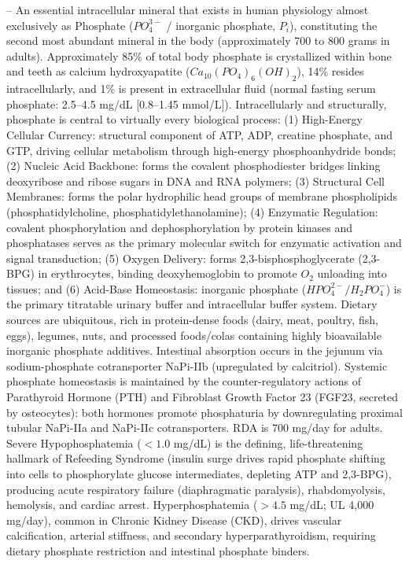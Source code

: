 -- An essential intracellular mineral that exists in human physiology almost exclusively as Phosphate ($PO_4^{3-}$ / inorganic phosphate, $P_i$), constituting the second most abundant mineral in the body (approximately 700 to 800 grams in adults). Approximately 85\% of total body phosphate is crystallized within bone and teeth as calcium hydroxyapatite ($Ca_{10}(PO_4)_6(OH)_2$), 14\% resides intracellularly, and 1\% is present in extracellular fluid (normal fasting serum phosphate: 2.5--4.5 mg/dL [0.8--1.45 mmol/L]). Intracellularly and structurally, phosphate is central to virtually every biological process: (1) High-Energy Cellular Currency: structural component of ATP, ADP, creatine phosphate, and GTP, driving cellular metabolism through high-energy phosphoanhydride bonds; (2) Nucleic Acid Backbone: forms the covalent phosphodiester bridges linking deoxyribose and ribose sugars in DNA and RNA polymers; (3) Structural Cell Membranes: forms the polar hydrophilic head groups of membrane phospholipids (phosphatidylcholine, phosphatidylethanolamine); (4) Enzymatic Regulation: covalent phosphorylation and dephosphorylation by protein kinases and phosphatases serves as the primary molecular switch for enzymatic activation and signal transduction; (5) Oxygen Delivery: forms 2,3-bisphosphoglycerate (2,3-BPG) in erythrocytes, binding deoxyhemoglobin to promote $O_2$ unloading into tissues; and (6) Acid-Base Homeostasis: inorganic phosphate ($HPO_4^{2-}/H_2PO_4^-$) is the primary titratable urinary buffer and intracellular buffer system. Dietary sources are ubiquitous, rich in protein-dense foods (dairy, meat, poultry, fish, eggs), legumes, nuts, and processed foods/colas containing highly bioavailable inorganic phosphate additives. Intestinal absorption occurs in the jejunum via sodium-phosphate cotransporter NaPi-IIb (upregulated by calcitriol). Systemic phosphate homeostasis is maintained by the counter-regulatory actions of Parathyroid Hormone (PTH) and Fibroblast Growth Factor 23 (FGF23, secreted by osteocytes): both hormones promote phosphaturia by downregulating proximal tubular NaPi-IIa and NaPi-IIc cotransporters. RDA is 700 mg/day for adults. Severe Hypophosphatemia ($<1.0$ mg/dL) is the defining, life-threatening hallmark of Refeeding Syndrome (insulin surge drives rapid phosphate shifting into cells to phosphorylate glucose intermediates, depleting ATP and 2,3-BPG), producing acute respiratory failure (diaphragmatic paralysis), rhabdomyolysis, hemolysis, and cardiac arrest. Hyperphosphatemia ($>4.5$ mg/dL; UL 4,000 mg/day), common in Chronic Kidney Disease (CKD), drives vascular calcification, arterial stiffness, and secondary hyperparathyroidism, requiring dietary phosphate restriction and intestinal phosphate binders.

